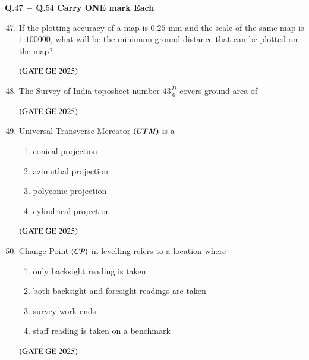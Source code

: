 \documentclass[journal,12pt,onecolumn]{IEEEtran}
\theoremstyle{remark}
\begin{document}
\textbf{Q.$47$ $-$ Q.$54$ Carry ONE mark Each}\\
\begin{enumerate}
\setcounter{enumi}{46}
\item If the plotting accuracy of a map is $0.25$ mm and the scale of the same map is $1$:$100000$, what will be the minimum ground distance that can be plotted on the map?
\begin{enumerate}
\end{enumerate}
\hfill $\left(\text{GATE GE 2025}\right)$
\bigskip
\item The Survey of India toposheet number $43\frac{D}{6}$ covers ground area of
\begin{enumerate}
\end{enumerate}
\hfill $\left(\text{GATE GE 2025}\right)$
\bigskip
\item Universal Transverse Mercator $\left(UTM\right)$ is a
\begin{enumerate}
\item conical projection
\item azimuthal projection
\item polyconic projection
\item cylindrical projection
\end{enumerate}
\hfill $\left(\text{GATE GE 2025}\right)$
\bigskip
\item Change Point $\left(CP\right)$ in levelling refers to a location where
\begin{enumerate}
\item only backsight reading is taken
\item both backsight and foresight readings are taken
\item survey work ends
\item staff reading is taken on a benchmark
\end{enumerate}
\hfill $\left(\text{GATE GE 2025}\right)$

\end{enumerate}
\end{document}

